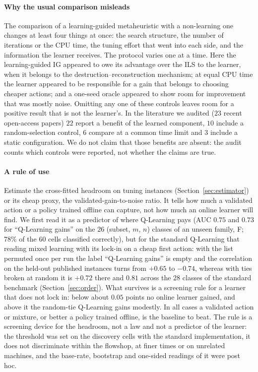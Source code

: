 \paragraph{Why the usual comparison misleads} The comparison of a learning-guided metaheuristic with a non-learning one changes at least four things at once: the search structure, the number of iterations or the CPU time, the tuning effort that went into each side, and the information the learner receives. The protocol varies one at a time. Here the learning-guided IG appeared to owe its advantage over the ILS to the learner, when it belongs to the destruction--reconstruction mechanism; at equal CPU time the learner appeared to be responsible for a gain that belongs to choosing cheaper actions; and a one-seed oracle appeared to show room for improvement that was mostly noise. Omitting any one of these controls leaves room for a positive result that is not the learner's. In the literature we audited ($23$ recent open-access papers) $22$ report a benefit of the learned component, $10$ include a random-selection control, $6$ compare at a common time limit and $3$ include a static configuration. We do not claim that those benefits are absent: the audit counts which controls were reported, not whether the claims are true.

\paragraph{A rule of use} Estimate the cross-fitted headroom on tuning instances (Section~\ref{sec:estimator}) or its cheap proxy, the validated-gain-to-noise ratio. It tells how much a validated action or a policy trained offline can capture, not how much an online learner will find. We first read it as a predictor of where Q-Learning pays (AUC $0.75$ and $0.73$ for ``Q-Learning gains'' on the $26$ (subset, $m$, $n$) classes of an unseen family, F; $78\%$ of the $60$ cells classified correctly), but for the standard Q-Learning that reading mixed learning with its lock-in on a cheap first action: with the list permuted once per run the label ``Q-Learning gains'' is empty and the correlation on the held-out published instances turns from $+0.65$ to $-0.74$, whereas with ties broken at random it is $+0.72$ there and $0.81$ across the $28$ classes of the standard benchmark (Section~\ref{sec:order}). What survives is a screening rule for a learner that does not lock in: below about $0.05$ points no online learner gained, and above it the random-tie Q-Learning gains modestly. In all cases a validated action or mixture, or better a policy trained offline, is the baseline to beat. The rule is a screening device for the headroom, not a law and not a predictor of the learner: the threshold was set on the discovery cells with the standard implementation, it does not discriminate within the flowshop, at finer times or on unrelated machines, and the base-rate, bootstrap and one-sided readings of it were post hoc.

